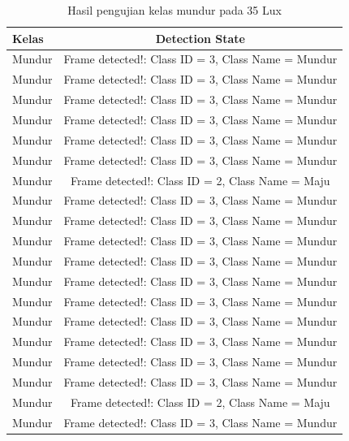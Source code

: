 \begin{longtable}{|l|c|}
  \caption{Hasil pengujian kelas mundur pada 35 Lux}
  \label{tb:luxmundur} \\
  \hline
  \rowcolor[HTML]{C0C0C0} 
  \textbf{Kelas} & \textbf{Detection State}                           \\ \hline
  Mundur         & Frame detected!: Class ID = 3, Class Name = Mundur \\ \hline
  Mundur         & Frame detected!: Class ID = 3, Class Name = Mundur \\ \hline
  Mundur         & Frame detected!: Class ID = 3, Class Name = Mundur \\ \hline
  Mundur         & Frame detected!: Class ID = 3, Class Name = Mundur \\ \hline
  Mundur         & Frame detected!: Class ID = 3, Class Name = Mundur \\ \hline
  Mundur         & Frame detected!: Class ID = 3, Class Name = Mundur \\ \hline
  Mundur         & Frame detected!: Class ID = 2, Class Name = Maju   \\ \hline
  Mundur         & Frame detected!: Class ID = 3, Class Name = Mundur \\ \hline
  Mundur         & Frame detected!: Class ID = 3, Class Name = Mundur \\ \hline
  Mundur         & Frame detected!: Class ID = 3, Class Name = Mundur \\ \hline
  Mundur         & Frame detected!: Class ID = 3, Class Name = Mundur \\ \hline
  Mundur         & Frame detected!: Class ID = 3, Class Name = Mundur \\ \hline
  Mundur         & Frame detected!: Class ID = 3, Class Name = Mundur \\ \hline
  Mundur         & Frame detected!: Class ID = 3, Class Name = Mundur \\ \hline
  Mundur         & Frame detected!: Class ID = 3, Class Name = Mundur \\ \hline
  Mundur         & Frame detected!: Class ID = 3, Class Name = Mundur \\ \hline
  Mundur         & Frame detected!: Class ID = 3, Class Name = Mundur \\ \hline
  Mundur         & Frame detected!: Class ID = 2, Class Name = Maju   \\ \hline
  Mundur         & Frame detected!: Class ID = 3, Class Name = Mundur \\ \hline

\end{longtable}
